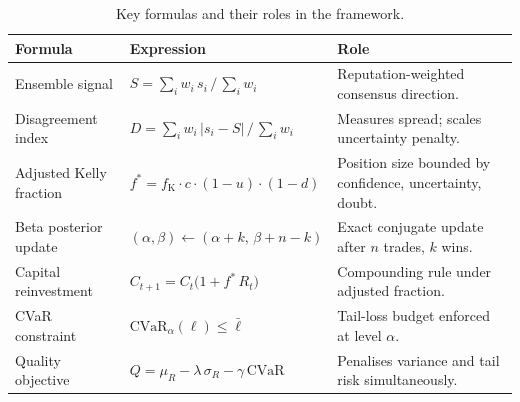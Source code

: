 \documentclass[12pt,openany]{book}
\numberwithin{equation}{chapter}
\theoremstyle{plain}
\theoremstyle{definition}
\theoremstyle{remark}
\numberwithin{equation}{chapter}
\theoremstyle{plain}
\begin{document}
\begin{table}[H]
\centering
\caption{Key formulas and their roles in the framework.}
\label{tab:key-formulas}
\small
\begin{tabularx}{\linewidth}{@{} l X X @{}}
\toprule
\textbf{Formula} & \textbf{Expression} & \textbf{Role} \\
\midrule
Ensemble signal
  & $S = \sum_{i} w_i\,s_i\,/\,\sum_{i} w_i$
  & Reputation-weighted consensus direction. \\[3pt]
Disagreement index
  & $D = \sum_{i} w_i\,|s_i - S|\,/\,\sum_{i} w_i$
  & Measures spread; scales uncertainty penalty. \\[3pt]
Adjusted Kelly fraction
  & $f^* = f_{\mathrm{K}}\cdot c\cdot(1-u)\cdot(1-d)$
  & Position size bounded by confidence, uncertainty, doubt. \\[3pt]
Beta posterior update
  & $(\alpha,\beta)\!\leftarrow\!(\alpha+k,\,\beta+n-k)$
  & Exact conjugate update after $n$ trades, $k$ wins. \\[3pt]
Capital reinvestment
  & $C_{t+1} = C_t\bigl(1 + f^*\,R_t\bigr)$
  & Compounding rule under adjusted fraction. \\[3pt]
CVaR constraint
  & $\mathrm{CVaR}_\alpha(\ell)\le\bar{\ell}$
  & Tail-loss budget enforced at level $\alpha$. \\[3pt]
Quality objective
  & $Q = \mu_R - \lambda\,\sigma_R - \gamma\,\mathrm{CVaR}$
  & Penalises variance and tail risk simultaneously. \\
\bottomrule
\end{tabularx}
\end{table}
\end{document}
